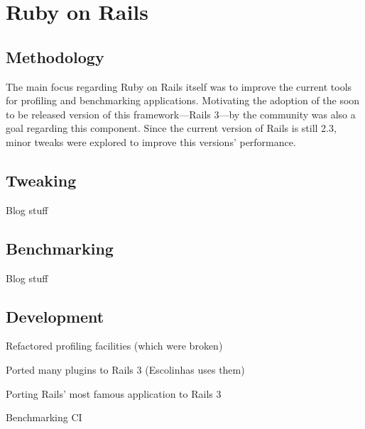 \section{Ruby on Rails} %
\label{solution:sec:ruby_on_rails}

\subsection{Methodology}
The main focus regarding Ruby on Rails itself was to improve the current tools for profiling and benchmarking applications. Motivating the adoption of the soon to be released version of this framework---Rails 3---by the community was also a goal regarding this component. Since the current version of Rails is still 2.3, minor tweaks were explored to improve this versions' performance.

\begin{comment}
Create tools to improve Rails

Push the Rails community forward
\end{comment}

\subsection{Tweaking}
Blog stuff

\subsection{Benchmarking}
Blog stuff

\subsection{Development}
Refactored profiling facilities (which were broken)

Ported many plugins to Rails 3 (Escolinhas uses them)

Porting Rails' most famous application to Rails 3

Benchmarking CI

